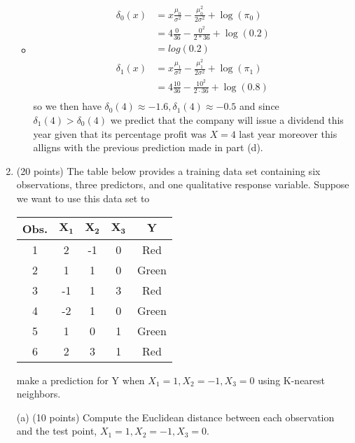 \documentclass[
]{article}
\begin{document}
\begin{enumerate}
\begin{itemize}

\item \begin{align*}
\delta_0(x) &= x\frac{\mu_0}{\sigma^2} - \frac{\mu_0^2}{2\sigma^2} + \log(\pi_0) \\
&= 4\frac{0}{36} - \frac{0^2}{2*36} + \log(0.2) \\
&= log(0.2) \\
\delta_1(x) &= x\frac{\mu_1}{\sigma^2} - \frac{\mu_1^2}{2\sigma^2} + \log(\pi_1) \\
&= 4\frac{10}{36} - \frac{10^2}{2\cdot36} + \log(0.8) \\
\end{align*}
so we then have $\delta_0(4) \approx -1.6 , \delta_1(4) \approx -0.5$ and since $\delta_1(4) > \delta_0(4)$ we predict that the company will issue a dividend this year given that its percentage profit was $X = 4$ last year moreover this alligns with the previous prediction made in part (d). 

\end{itemize}

\newpage
\item (20 points) The table below provides a training data set containing six observations, three predictors, and one qualitative response variable. Suppose we want to use this data set to 

\begin{center}
\begin{tabular}{|c|c|c|c|c|}
\hline
\textbf{Obs.} & \(\mathbf{X_1}\) & \(\mathbf{X_2}\) & \(\mathbf{X_3}\) & \(\mathbf{Y}\) \\
\hline
1 & 2 & -1 & 0 & Red \\
\hline
2 & 1 & 1 & 0 & Green \\
\hline
3 & -1 & 1 & 3 & Red \\
\hline
4 & -2 & 1 & 0 & Green \\
\hline
5 & 1 & 0 & 1 & Green \\
\hline
6 & 2 & 3 & 1 & Red \\
\hline
\end{tabular}
\end{center}
make a prediction for Y when $X_1 =1, X_2 = -1, X_3 = 0$ using K-nearest neighbors.

(a) (10 points) Compute the Euclidean distance between each observation and the test point, $X_1 =1, X_2 = -1, X_3 = 0$.

\begin{itemize}


\end{itemize}
\end{enumerate}
\end{document}
